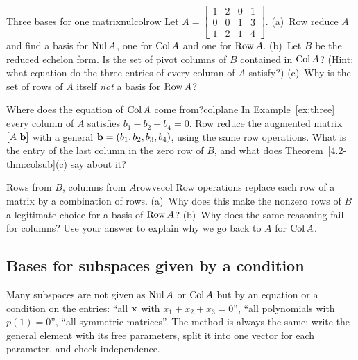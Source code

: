 \documentclass[11pt]{article}
\begin{document}
\begin{kc}{Three bases for one matrix}{nulcolrow}
Let $A=\begin{bmatrix}1&2&0&1\\0&0&1&3\\1&2&1&4\end{bmatrix}$. (a)~Row reduce $A$ and find a basis for $\operatorname{Nul} A$, one for $\operatorname{Col} A$ and one for $\operatorname{Row} A$. (b)~Let $B$ be the reduced echelon form. Is the set of pivot columns of $B$ contained in $\operatorname{Col} A$? (Hint: what equation do the three entries of every column of $A$ satisfy?) (c)~Why is the set of rows of $A$ itself \emph{not} a basis for $\operatorname{Row} A$?
\end{kc}

\begin{think}{Where does the equation of $\operatorname{Col} A$ come from?}{colplane}
In Example~\ref{ex:three} every column of $A$ satisfies $b_1-b_2+b_4=0$. Row reduce the augmented matrix $[A\ \bv{b}]$ with a general $\mathbf{b}=(b_1,b_2,b_3,b_4)$, using the same row operations. What is the entry of the last column in the zero row of $B$, and what does Theorem~\ref{4.2-thm:colsub}(c) say about it?
\end{think}

\begin{think}{Rows from $B$, columns from $A$}{rowvscol}
Row operations replace each row of a matrix by a combination of rows. (a)~Why does this make the nonzero rows of $B$ a legitimate choice for a basis of $\operatorname{Row} A$? (b)~Why does the same reasoning fail for columns? Use your answer to explain why we go back to $A$ for $\operatorname{Col} A$.
\end{think}

\subsection*{Bases for subspaces given by a condition}

Many subspaces are not given as $\operatorname{Nul} A$ or $\operatorname{Col} A$ but by an equation or a condition on the entries: ``all $\mathbf{x}$ with $x_1+x_2+x_3=0$'', ``all polynomials with $p(1)=0$'', ``all symmetric matrices''. The method is always the same: write the general element with its free parameters, split it into one vector for each parameter, and check independence.
\end{document}
